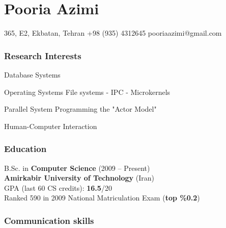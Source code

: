\documentclass{tccv}
\begin{document}
\part{Pooria Azimi}










\personal
    {365, E2, Ekbatan, Tehran}
    {+98 (935) 4312645}
    {pooriaazimi@gmail.com}







\section{Research Interests}


\begin{research_interest}

\item{Database Systems}
     {}

\item{Operating Systems}
     {File systems - IPC - Microkernels}

\item{Parallel System Programming}
     {the "Actor Model"}

\item{Human-Computer Interaction}
     {}

\end{research_interest}








\section{Education}

B.Sc. in {\bf\large Computer Science} (2009 -- Present)
\\[1.5pt]
{\bf Amirkabir University of Technology} (Iran)
\\[1.7pt]
GPA (last 60 CS credits): {\bf 16.5}/20
\bigskip\\
Ranked 590 in 2009 National Matriculation Exam ({\bf top \%0.2})








\section{Communication skills}
\end{document}
